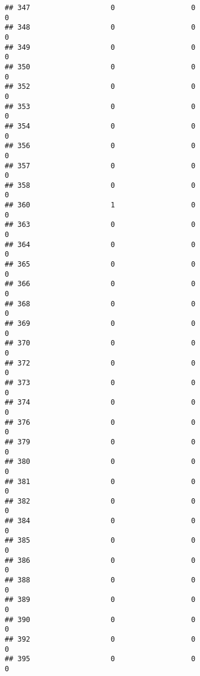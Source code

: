 \documentclass[
]{article}
\begin{document}
\begin{verbatim}
## 347                   0                  0                              0
## 348                   0                  0                              0
## 349                   0                  0                              0
## 350                   0                  0                              0
## 352                   0                  0                              0
## 353                   0                  0                              0
## 354                   0                  0                              0
## 356                   0                  0                              0
## 357                   0                  0                              0
## 358                   0                  0                              0
## 360                   1                  0                              0
## 363                   0                  0                              0
## 364                   0                  0                              0
## 365                   0                  0                              0
## 366                   0                  0                              0
## 368                   0                  0                              0
## 369                   0                  0                              0
## 370                   0                  0                              0
## 372                   0                  0                              0
## 373                   0                  0                              0
## 374                   0                  0                              0
## 376                   0                  0                              0
## 379                   0                  0                              0
## 380                   0                  0                              0
## 381                   0                  0                              0
## 382                   0                  0                              0
## 384                   0                  0                              0
## 385                   0                  0                              0
## 386                   0                  0                              0
## 388                   0                  0                              0
## 389                   0                  0                              0
## 390                   0                  0                              0
## 392                   0                  0                              0
## 395                   0                  0                              0

\end{verbatim}
\end{document}
